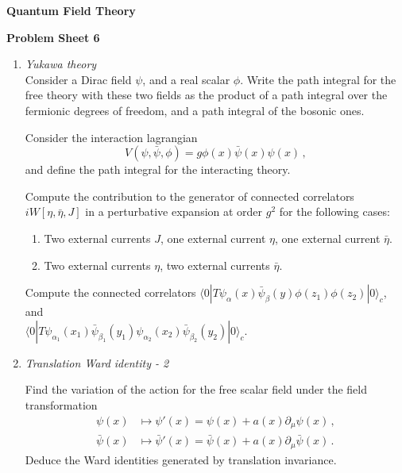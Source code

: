 \documentclass[12pt,a4paper]{article}
\newcommand{\psibar}{\bar{\psi}}
\newcommand{\etabar}{\bar{\eta}}
\begin{document}
\begin{center}
{\bf Quantum Field Theory}\\[\baselineskip]
\end{center}
{\bf Problem Sheet 6}

\begin{enumerate}
  \item {\it Yukawa theory} \\
    
    Consider a Dirac field $\psi$, and a real scalar $\phi$. Write the
    path integral for the free theory with these two fields as the
    product of a path integral over the fermionic degrees of freedom,
    and a path integral of the bosonic ones. 

    Consider the interaction lagrangian
    \[
    V(\psi,\psibar,\phi) = g \phi(x) \psibar(x) \psi(x)\, ,
    \]
    and define the path integral for the interacting theory. 

    Compute the contribution to the generator of connected correlators
    $iW[\eta,\etabar, J]$ in a perturbative expansion at order $g^2$
    for the following cases:
    \begin{enumerate}
    \item Two external currents $J$, one external current $\eta$, one
      external current $\etabar$.
    \item Two external currents $\eta$, two
      external currents $\etabar$.
    \end{enumerate}
    
    Compute the connected correlators
    $\langle 0 | T \psi_\alpha(x) \psibar_\beta(y) \phi(z_1)
    \phi(z_2)| 0 \rangle_c$,
    and \\
    $\langle 0 | T \psi_{\alpha_1}(x_1) \psibar_{\beta_1}(y_1)
    \psi_{\alpha_2}(x_2) \psibar_{\beta_2}(y_2) |0\rangle_c$.

    \bigskip

  \item {\it Translation Ward identity - 2}
    
    Find the variation of the action for the free scalar field under
    the field transformation
    \begin{align*}
    \psi(x) &\mapsto \psi'(x) = \psi(x) + a(x) \partial_\mu \psi(x)\,
              , \\
    \psibar(x) &\mapsto \psibar'(x) = \psibar(x) + a(x) \partial_\mu \psibar(x)\,
              .
    \end{align*}
    Deduce the Ward identities generated by translation invariance. 


\end{enumerate}
\end{document}
